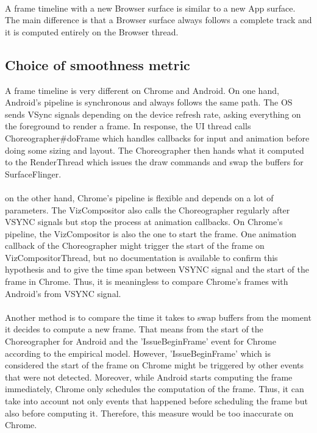 \documentclass{kththesis}
\begin{document}
\paragraph{}
A frame timeline with a new Browser surface is similar to a new App surface. The main difference is that a Browser surface always follows a complete track and it is computed entirely on the Browser thread.

\subsection{Choice of smoothness metric}
\label{results:metric}

A frame timeline is very different on Chrome and Android. 
On one hand, Android's pipeline is synchronous and always follows the same path. The OS sends VSync signals depending on the device refresh rate, asking everything on the foreground to render a frame. In response, the UI thread calls Choreographer\#doFrame which handles callbacks for input and animation before doing some sizing and layout. The Choreographer then hands what it computed to the RenderThread which issues the draw commands and swap the buffers for SurfaceFlinger.

\paragraph{}
 on the other hand, Chrome's pipeline is flexible and depends on a lot of parameters. The VizCompositor also calls the Choreographer regularly after VSYNC signals but stop the process at animation callbacks. On Chrome's pipeline, the VizCompositor is also the one to start the frame. One animation callback of the Choreographer might trigger the start of the frame on VizCompositorThread, but no documentation is available to confirm this hypothesis and to give the time span between VSYNC signal and the start of the frame in Chrome. \newline
Thus, it is meaningless to compare Chrome's frames with Android's from VSYNC signal.

\paragraph{}
Another method is to compare the time it takes to swap buffers from the moment it decides to compute a new frame. That means from the start of the Choreographer for Android and the 'IssueBeginFrame' event for Chrome according to the empirical model. However, 'IssueBeginFrame' which is considered the start of the frame on Chrome might be triggered by other events that were not detected. Moreover, while Android starts computing the frame immediately, Chrome only schedules the computation of the frame. Thus, it can take into account not only events that happened before scheduling the frame but also before computing it.  
Therefore, this measure would be too inaccurate on Chrome. \newline
\end{document}
